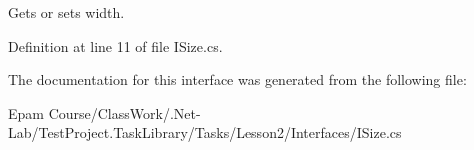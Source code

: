 Gets or sets width. 



Definition at line 11 of file I\+Size.\+cs.



The documentation for this interface was generated from the following file\+:\begin{DoxyCompactItemize}
\item 
Epam Course/\+Class\+Work/.\+Net-\/\+Lab/\+Test\+Project.\+Task\+Library/\+Tasks/\+Lesson2/\+Interfaces/I\+Size.\+cs\end{DoxyCompactItemize}
